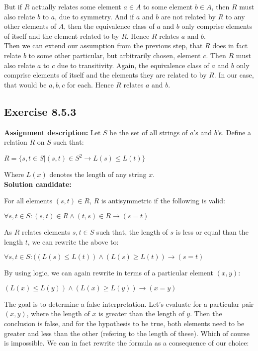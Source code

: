 \documentclass{report}
\newcommand{\cent}[1]{\begin{center}#1\end{center}}
\newcommand{\In}{\! \in \!}
\newcommand{\assignmentDescription}{\textbf{Assignment description: }}
\newcommand{\solution}{\textbf{Solution candidate: }}
\newcommand{\QED}{\boxed{}}
\newcommand{\Exercise}[1]{\subsection{Exercise #1}}
\begin{document}
	But if $R$ actually relates some element $a \In A$ to some element $b \In A$, then $R$ must also relate $b$ to $a$, due to symmetry. And if $a$ and $b$ are not related by $R$ to any other elements of $A$, then the equivalence class of $a$ and $b$ only comprise elements of itself and the element related to by $R$. Hence $R$ relates $a$ and $b$.\\
	
	Then we can extend our assumption from the previous step, that $R$ does in fact relate $b$ to some other particular, but arbitrarily chosen, element $c$. Then $R$ must also relate $a$ to $c$ due to transitivity. Again, the equivalence class of $a$ and $b$ only comprise elements of itself and the elements they are related to by $R$. In our case, that would be $a,b,c$ for each. Hence $R$ relates $a$ and $b$.\\
	\QED
	
	\Exercise{8.5.3}
	\assignmentDescription
	Let $S$ be the set of all strings of $a$'s and $b$'s. Define a relation $ R $ on $ S $ such that:
	
	\cent{$ R = \{s,t \In S | (s,t) \In S^2 \to L(s) \leq L(t)\}$} 
	
	Where $L(x)$ denotes the length of any string $x$.\\
	
	\solution
	
	For all elements $(s,t) \In R$, $R$ is antisymmetric if the following is valid:
	
	\cent{$\forall s,t \In S : (s,t) \In R \wedge (t,s) \In R \to (s = t)$}
	
	As $R$ relates elements $s,t \In S$ such that, the length of $s$ is less or equal than the length $t$, we can rewrite the above to:
	
	\cent{$\forall s,t \In S : ((L(s) \leq L(t)) \wedge (L(s) \geq L(t))\to (s = t)$}
	
	By using logic, we can again rewrite in terms of a particular element $(x,y)$: 
	
	\cent{$(L(x) \leq L(y)) \wedge (L(x) \geq L(y))\to (x = y)$}
	
	The goal is to determine a false interpretation. Let's evaluate for a particular pair $(x,y)$, where the length of $x$ is greater than the length of $y$. Then the conclusion is false, and for the hypothesis to be true, both elements need to be greater and less than the other (refering to the length of these). Which of course is impossible. We can in fact rewrite the formula as a consequence of our choice:
	
\end{document}
